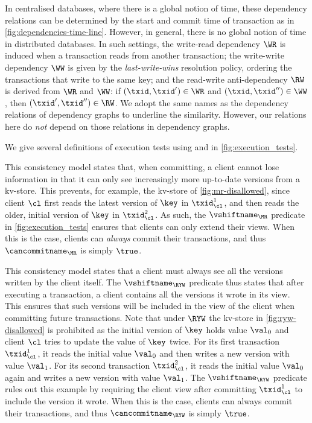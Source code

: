 

\noindent 
In centralised databases, where there is a global notion of time, 
these dependency relations can be determined by the start and commit time of transaction as in \cref{fig:dependencies-time-line}.
However, in general, there is no global notion of time in distributed databases.
In such settings, the write-read dependency \( \WR \) is induced when a transaction reads from another transaction;
the write-write dependency \( \WW \) is given by the \emph{last-write-wins} resolution policy,
ordering the transactions that write to the same key; and
the read-write anti-dependency \( \RW \) is derived from \( \WR \) and \( \WW \):
if \( (\txid, \txid') \in \WR \) and \( (\txid, \txid'') \in \WW \), then \( (\txid',\txid'') \in \RW \).
We adopt the same names as the dependency relations of dependency graphs \citep{adya}
to underline the similarity.
However, our relations here do \emph{not} depend on those relations in dependency graphs.

We give several definitions of
execution tests using \vshiftname and \cancommitname in \cref{fig:execution_tests}. 



This consistency model states that,  when committing, a client
cannot lose information in that it can only see increasingly more up-to-date versions from a kv-store.
This prevents, for example, the kv-store of \cref{fig:mr-disallowed},
since client \(\cl\) first reads the latest version of \(\key\) in \(\txid_{\cl}^{1}\), 
and then reads the older, initial version of \(\key\) in \(\txid_{\cl}^{2}\).  
As such, the \(\vshiftname_{\MR}\) predicate in \cref{fig:execution_tests} ensures that clients  can only extend their views. 
When this is the case, clients can \emph{always} commit their transactions, and thus \(\cancommitname_{\MR}\) is simply \(\true\). 

This consistency model states that a client must always see all the versions written by the client itself. 
The \(\vshiftname_{\RYW}\) predicate thus states that after executing a transaction, a client 
contains all the versions it wrote in its view. This ensures that such versions will be included in the view of the client 
when committing future transactions.
Note that under \(\RYW\) the kv-store in \cref{fig:ryw-disallowed} is prohibited as
the initial version of \(\key\) holds value \(\val_0\) 
and client \(\cl\) tries to update the value of \(\key\) twice.  
For its first transaction \( \txid_{\cl}^1\), it reads the initial value \(\val_0\) and then writes a new version with value \(\val_1\). 
For its second transaction \( \txid_{\cl}^2\), it reads the initial value \(\val_0\) again and writes a new version with value \(\val_1\).
The \(\vshiftname_{\RYW}\) predicate rules out this example by requiring the client view after committing \(\txid_{\cl}^{1}\) to include the version it wrote.  
When this is the case, clients can always commit their transactions, and thus \(\cancommitname_{\RYW}\) is simply \(\true\).

